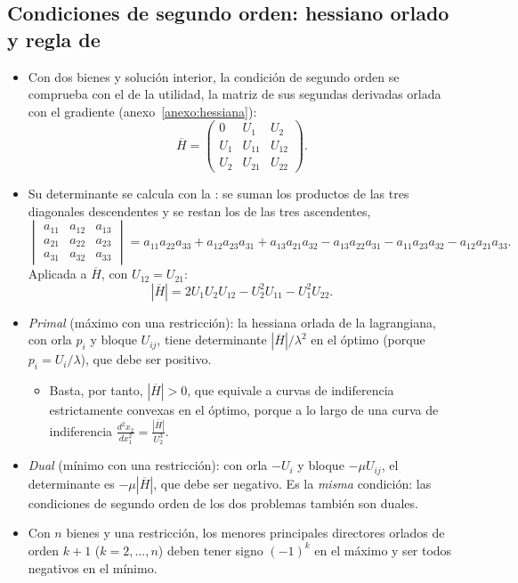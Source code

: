\documentclass[11pt]{article}
\begin{document}
\subsection{Condiciones de segundo orden:\cortetitulo{} hessiano orlado y regla de }\label{anexo:condiciones-segundo-orden}

\begin{itemize}
\item Con dos bienes y solución interior, la condición de segundo orden se comprueba con el  de la utilidad, la matriz de sus segundas derivadas orlada con el gradiente (anexo~\ref{anexo:hessiana}):
  \begin{equation*}
  \overline{H}=\begin{pmatrix}0&U_1&U_2\\U_1&U_{11}&U_{12}\\U_2&U_{21}&U_{22}\end{pmatrix}.
  \end{equation*}
\item Su determinante se calcula con la : se suman los productos de las tres diagonales descendentes y se restan los de las tres ascendentes,
  \begin{equation*}
  \begin{vmatrix}a_{11}&a_{12}&a_{13}\\a_{21}&a_{22}&a_{23}\\a_{31}&a_{32}&a_{33}\end{vmatrix}
  =a_{11}a_{22}a_{33}+a_{12}a_{23}a_{31}+a_{13}a_{21}a_{32}-a_{13}a_{22}a_{31}-a_{11}a_{23}a_{32}-a_{12}a_{21}a_{33}.
  \end{equation*}
  Aplicada a $\overline{H}$, con $U_{12}=U_{21}$:
  \begin{equation*}
  |\overline{H}|=2U_1U_2U_{12}-U_2^2U_{11}-U_1^2U_{22}.
  \end{equation*}
\item \emph{Primal} (máximo con una restricción): la hessiana orlada de la lagrangiana, con orla $p_i$ y bloque $U_{ij}$, tiene determinante $|\overline{H}|/\lambda^2$ en el óptimo (porque $p_i=U_i/\lambda$), que debe ser positivo.
  \begin{itemize}
  \item Basta, por tanto, $|\overline{H}|>0$, que equivale a curvas de indiferencia estrictamente convexas en el óptimo, porque a lo largo de una curva de indiferencia $\frac{d^2x_2}{dx_1^2}=\frac{|\overline{H}|}{U_2^3}$.
  \end{itemize}
\item \emph{Dual} (mínimo con una restricción): con orla $-U_i$ y bloque $-\mu U_{ij}$, el determinante es $-\mu|\overline{H}|$, que debe ser negativo. Es la \emph{misma} condición: las condiciones de segundo orden de los dos problemas también son duales.
\item Con $n$ bienes y una restricción, los menores principales directores orlados de orden $k+1$ ($k=2,\dots,n$) deben tener signo $(-1)^k$ en el máximo y ser todos negativos en el mínimo\nocite{SydsaeterEtAl2008Further}.
\end{itemize}
\end{document}
